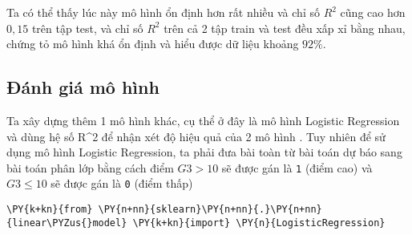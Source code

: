     Ta có thể thấy lúc này mô hình ổn định hơn rất nhiều và chỉ số \(R^2\)
cũng cao hơn \(0,15\) trên tập test, và chỉ số \(R^2\) trên cả 2 tập
train và test đều xấp xỉ bằng nhau, chứng tỏ mô hình khá ổn định và hiểu
được dữ liệu khoảng \(92\%\).

    \hypertarget{ux111uxe1nh-giuxe1-muxf4-huxecnh}{%
\subsection{Đánh giá mô hình}\label{ux111uxe1nh-giuxe1-muxf4-huxecnh}}

    Ta xây dựng thêm 1 mô hình khác, cụ thể ở đây là mô hình Logistic
Regression và dùng hệ số R\^{}2 để nhận xét độ hiệu quả của 2 mô hình .
Tuy nhiên để sử dụng mô hình Logistic Regression, ta phải đưa bài toàn
từ bài toán dự báo sang bài toán phân lớp bằng cách điểm \(G3>10\) sẽ
được gán là \texttt{1} (điểm cao) và \(G3 \leq 10\) sẽ được gán là
\texttt{0} (điểm thấp)

    \begin{tcolorbox}[breakable, size=fbox, boxrule=1pt, pad at break*=1mm,colback=cellbackground, colframe=cellborder]
\begin{Verbatim}[commandchars=\\\{\}]
\PY{k+kn}{from} \PY{n+nn}{sklearn}\PY{n+nn}{.}\PY{n+nn}{linear\PYZus{}model} \PY{k+kn}{import} \PY{n}{LogisticRegression}
\end{Verbatim}
\end{tcolorbox}

